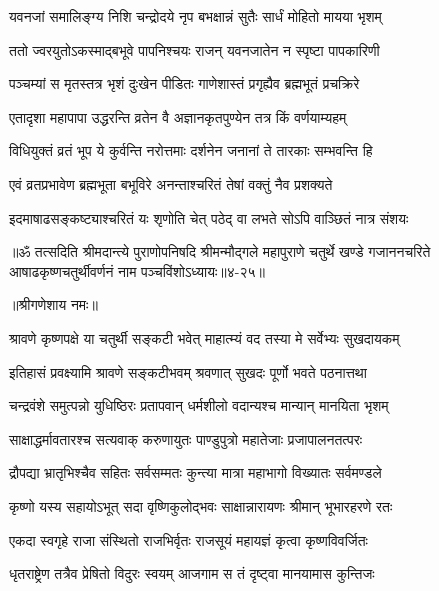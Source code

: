 \twolineshloka
{यवनजां समालिङ्ग्य निशि चन्द्रोदये नृप}
{बभक्षान्नं सुतैः सार्धं मोहितो मायया भृशम्} %

\twolineshloka
{ततो ज्वरयुतोऽकस्माद्बभूवे पापनिश्चयः}
{राजन् यवनजातेन न स्पृष्टा पापकारिणी} %

\twolineshloka
{पञ्चम्यां स मृतस्तत्र भृशं दुःखेन पीडितः}
{गाणेशास्तं प्रगृह्यैव ब्रह्मभूतं प्रचक्रिरे} %

\twolineshloka
{एतादृशा महापापा उद्धरन्ति व्रतेन वै}
{अज्ञानकृतपुण्येन तत्र किं वर्णयाम्यहम्} %

\twolineshloka
{विधियुक्तं व्रतं भूप ये कुर्वन्ति नरोत्तमाः}
{दर्शनेन जनानां ते तारकाः सम्भवन्ति हि} %

\twolineshloka
{एवं व्रतप्रभावेण ब्रह्मभूता बभूविरे}
{अनन्ताश्चरितं तेषां वक्तुं नैव प्रशक्यते} %

\twolineshloka
{इदमाषाढसङ्कष्ट्याश्चरितं यः श‍ृणोति चेत्}
{पठेद् वा लभते सोऽपि वाञ्छितं नात्र संशयः} %

॥ॐ तत्सदिति श्रीमदान्त्ये पुराणोपनिषदि श्रीमन्मौद्गले महापुराणे चतुर्थे खण्डे गजाननचरिते आषाढकृष्णचतुर्थीवर्णनं नाम पञ्चविंशोऽध्यायः॥४-२५॥


\label{sec:shravana-krishna-chaturthi-mahatmya-varnanam}

\centerline{॥श्रीगणेशाय नमः॥}


\twolineshloka
{श्रावणे कृष्णपक्षे या चतुर्थी सङ्कटी भवेत्}
{माहात्म्यं वद तस्या मे सर्वेभ्यः सुखदायकम्} %


\twolineshloka
{इतिहासं प्रवक्ष्यामि श्रावणे सङ्कटीभवम्}
{श्रवणात् सुखदः पूर्णो भवते पठनात्तथा} %

\twolineshloka
{चन्द्रवंशे समुत्पन्नो युधिष्ठिरः प्रतापवान्}
{धर्मशीलो वदान्यश्च मान्यान् मानयिता भृशम्} %

\twolineshloka
{साक्षाद्धर्मावतारश्च सत्यवाक् करुणायुतः}
{पाण्डुपुत्रो महातेजाः प्रजापालनतत्परः} %

\twolineshloka
{द्रौपद्या भ्रातृभिश्चैव सहितः सर्वसम्मतः}
{कुन्त्या मात्रा महाभागो विख्यातः सर्वमण्डले} %

\twolineshloka
{कृष्णो यस्य सहायोऽभूत् सदा वृष्णिकुलोद्भवः}
{साक्षान्नारायणः श्रीमान् भूभारहरणे रतः} %

\twolineshloka
{एकदा स्वगृहे राजा संस्थितो राजभिर्वृतः}
{राजसूयं महायज्ञं कृत्वा कृष्णविवर्जितः} %

\twolineshloka
{धृतराष्ट्रेण तत्रैव प्रेषितो विदुरः स्वयम्}
{आजगाम स तं दृष्ट्वा मानयामास कुन्तिजः} %

